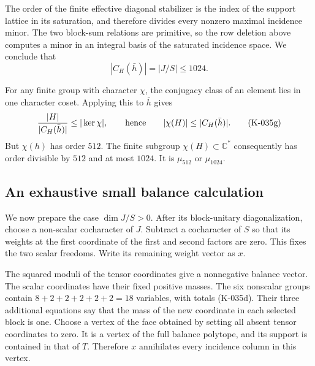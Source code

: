 The order of the finite effective diagonal stabilizer is the index
of the support lattice in its saturation, and therefore divides
every nonzero maximal incidence minor.  The two block-sum relations
are primitive, so the row deletion above computes a minor in an
integral basis of the saturated incidence space.  We conclude that
\[
                     |C_H(\bar h)|=|J/S|\le1024.        \tag{K-035f}
\]

For any finite group with character $\chi$, the conjugacy class
of an element lies in one character coset.  Applying this to
$\bar h$ gives
\[
 \frac{|H|}{|C_H(\bar h)|}\le |\ker\chi|,
 \qquad\hbox{hence}\qquad
                         |\chi(H)|\le |C_H(\bar h)|.
                                                               \tag{K-035g}
\]
But $\chi(h)$ has order $512$.  The finite subgroup
$\chi(H)\subset\mathbb C^*$ consequently has order divisible by
$512$ and at most $1024$.  It is $\mu_{512}$ or $\mu_{1024}$.

\subsection*{An exhaustive small balance calculation}

We now prepare the case $\dim J/S>0$.  After its block-unitary
diagonalization, choose a non-scalar cocharacter of $J$.
Subtract a cocharacter of $S$ so that its weights at the first
coordinate of the first and second factors are zero.  This fixes
the two scalar freedoms.  Write its remaining weight vector as $x$.

The squared moduli of the tensor coordinates give a nonnegative
balance vector.  The scalar coordinates have their fixed positive
masses.  The six nonscalar groups contain $8+2+2+2+2+2=18$
variables, with totals (K-035d).  Their three additional equations
say that the mass of the new coordinate in each selected block
is one.  Choose a vertex of the face obtained by setting all
absent tensor coordinates to zero.  It is a vertex of the full
balance polytope, and its support is contained in that of $T$.
Therefore $x$ annihilates every incidence column in this vertex.

